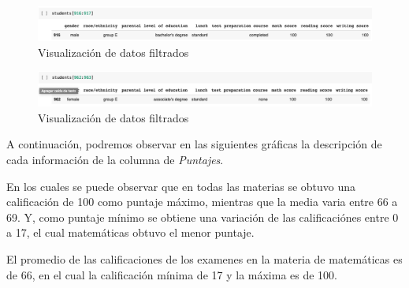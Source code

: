 \documentclass[conference,compsoc,onecolumn]{IEEEtran}
\begin{document}
    \begin{figure}[H]       
        \centering
        \includegraphics[scale = 0.4]{3.png}
        \caption{Visualización de datos filtrados}
        \label{subfigura16}
    \end{figure}
        
   
    \begin{figure}[H]       
        \centering
        \includegraphics[scale = 0.48]{4.png}
        \caption{Visualización de datos filtrados}
        \label{subfigura10}
    \end{figure}
    
    A continuación, podremos observar en las siguientes gráficas la descripción de cada información de la columna de \textit{Puntajes}.
    
    En los cuales se puede observar que en todas las materias se obtuvo una calificación de 100 como puntaje máximo, mientras que la media varia entre 66 a 69. Y, como puntaje mínimo se obtiene una variación de las calificaciónes entre 0 a 17, el cual matemáticas obtuvo el menor puntaje.
    
    
    El promedio de las calificaciones de los examenes en la materia de matemáticas es de 66, en el cual la calificación mínima de 17 y la máxima es de 100.
    
\end{document}
